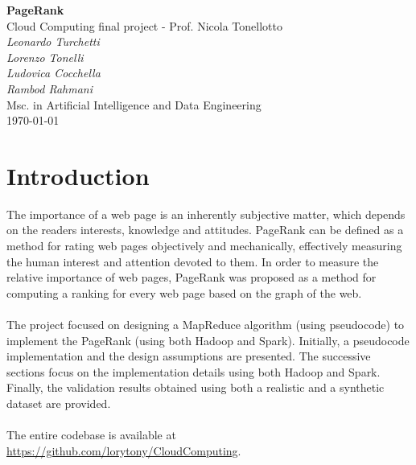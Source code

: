 \documentclass[11pt,a4paper]{article}
\begin{document}
\begin{center}
	\Large\textbf{PageRank}\\
	\vspace{0.2cm}
	\large{Cloud Computing final project - Prof. Nicola Tonellotto}\\
	\vspace{1.0cm}
	\large\textit{Leonardo Turchetti}\\
	\large\textit{Lorenzo Tonelli}\\
	\large\textit{Ludovica Cocchella}\\
	\large\textit{Rambod Rahmani}\\
	\vspace{0.2cm}
	\normalsize{Msc. in Artificial Intelligence and Data Engineering}\\
	\vspace{1.0cm}
	\today
\end{center}
\vspace{1cm}
\tableofcontents
\vspace{1cm}
\section{Introduction}
The importance of a web page is an inherently subjective matter, which depends on the readers interests, knowledge and attitudes. PageRank can be defined as a method for rating web pages objectively and mechanically, effectively measuring the human interest and attention devoted to them. In order to measure the relative importance of web pages, PageRank was proposed as a method for computing a ranking for every web page based on the graph of the web.\\
\\
The project focused on designing a MapReduce algorithm (using pseudocode) to implement the PageRank (using both Hadoop and Spark). Initially, a pseudocode implementation and the design assumptions are presented. The successive sections focus on the implementation details using both Hadoop and Spark. Finally, the validation results obtained using both a realistic and a synthetic dataset are provided.\\
\\
The entire codebase is available at \url{https://github.com/lorytony/CloudComputing}.
\end{document}
